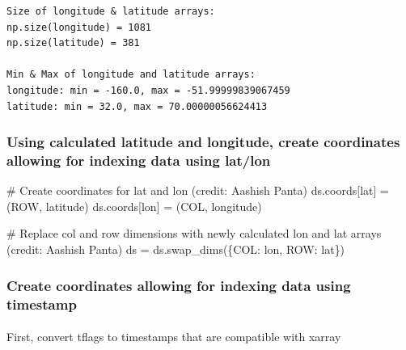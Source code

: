 \documentclass[
  letterpaper,
  DIV=11,
  numbers=noendperiod]{scrreprt}
\makeatletter
\let\oldparagraph\paragraph
\renewcommand{\paragraph}{
    \@ifstar
      \xxxParagraphStar
      \xxxParagraphNoStar
  }
\newcommand{\xxxParagraphStar}[1]{\oldparagraph*{#1}\mbox{}}
\newcommand{\xxxParagraphNoStar}[1]{\oldparagraph{#1}\mbox{}}
\newenvironment{Shaded}{\begin{snugshade}}{\end{snugshade}}
\newcommand{\CommentTok}[1]{\textcolor[rgb]{0.37,0.37,0.37}{#1}}
\newcommand{\NormalTok}[1]{\textcolor[rgb]{0.00,0.23,0.31}{#1}}
\newcommand{\OperatorTok}[1]{\textcolor[rgb]{0.37,0.37,0.37}{#1}}
\newcommand{\StringTok}[1]{\textcolor[rgb]{0.13,0.47,0.30}{#1}}
\makeatother
\begin{document}
\begin{verbatim}
Size of longitude & latitude arrays:
np.size(longitude) = 1081
np.size(latitude) = 381

Min & Max of longitude and latitude arrays:
longitude: min = -160.0, max = -51.99999839067459
latitude: min = 32.0, max = 70.00000056624413
\end{verbatim}

\subsubsection{Using calculated latitude and longitude, create
coordinates allowing for indexing data using
lat/lon}\label{using-calculated-latitude-and-longitude-create-coordinates-allowing-for-indexing-data-using-latlon}

\begin{Shaded}
\begin{Highlighting}[]
\CommentTok{\# Create coordinates for lat and lon (credit: Aashish Panta)}
\NormalTok{ds.coords[}\StringTok{\textquotesingle{}lat\textquotesingle{}}\NormalTok{] }\OperatorTok{=}\NormalTok{ (}\StringTok{\textquotesingle{}ROW\textquotesingle{}}\NormalTok{, latitude)}
\NormalTok{ds.coords[}\StringTok{\textquotesingle{}lon\textquotesingle{}}\NormalTok{] }\OperatorTok{=}\NormalTok{ (}\StringTok{\textquotesingle{}COL\textquotesingle{}}\NormalTok{, longitude)}

\CommentTok{\# Replace col and row dimensions with newly calculated lon and lat arrays (credit: Aashish Panta)}
\NormalTok{ds }\OperatorTok{=}\NormalTok{ ds.swap\_dims(\{}\StringTok{\textquotesingle{}COL\textquotesingle{}}\NormalTok{: }\StringTok{\textquotesingle{}lon\textquotesingle{}}\NormalTok{, }\StringTok{\textquotesingle{}ROW\textquotesingle{}}\NormalTok{: }\StringTok{\textquotesingle{}lat\textquotesingle{}}\NormalTok{\})}
\end{Highlighting}
\end{Shaded}

\subsubsection{Create coordinates allowing for indexing data using
timestamp}\label{create-coordinates-allowing-for-indexing-data-using-timestamp}

\paragraph{First, convert tflags to timestamps that are compatible with
xarray}\label{first-convert-tflags-to-timestamps-that-are-compatible-with-xarray}
\end{document}
